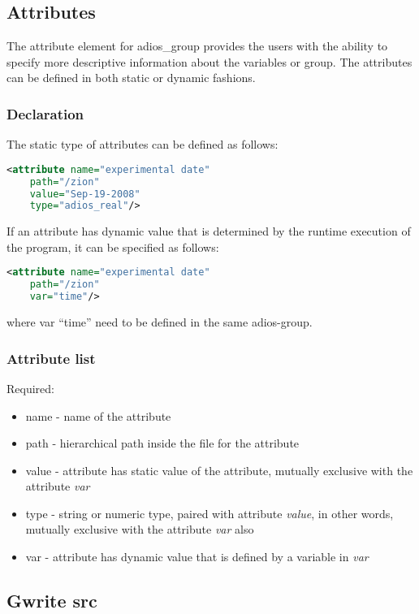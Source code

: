 \subsection{Attributes}
The attribute element for adios\_group provides the users with the ability to specify 
more descriptive information about the variables or group. The attributes can be 
defined in both static or dynamic fashions.

\subsubsection{Declaration}

The static type of attributes can be defined as follows:
\begin{lstlisting}[language=XML]
<attribute name="experimental date"
	path="/zion"
	value="Sep-19-2008" 
	type="adios_real"/>
\end{lstlisting}

If an attribute has dynamic value that is determined by the runtime execution of 
the program, it can be specified as follows:
\begin{lstlisting}[language=XML]
<attribute name="experimental date"
	path="/zion"
	var="time"/>
\end{lstlisting}
where var ``time'' need to be defined in the same adios-group.

\subsubsection{Attribute list}

Required:
\begin{itemize}
\item name -  name of the attribute
\item path - hierarchical path inside the file for the attribute
\item value - attribute has static value of the attribute, mutually exclusive with the  attribute \textit{var}
\item type - string or numeric type, paired with attribute \textit{value}, in other words, mutually exclusive with the attribute \textit{var} also
\item var - attribute has dynamic value that is defined by a variable in \textit{var}
\end{itemize}

\subsection{Gwrite src}

